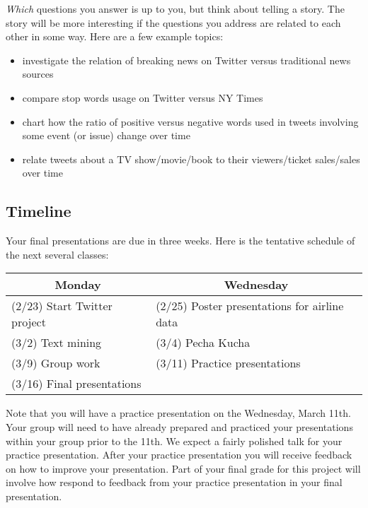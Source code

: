 \documentclass[11pt, oneside]{article}   	%
\begin{document}
{\em Which} questions you answer is up to you, but
think about telling a story. The story will be more interesting if the
questions you address are related to each other in some way.
Here are a few example topics:
\begin{itemize}
\item investigate the relation of breaking news on Twitter versus traditional
  news sources
\item compare stop words usage on Twitter versus NY Times
\item chart how the ratio of positive versus negative words used in tweets
  involving some event (or issue) change over time
\item relate tweets about a TV show/movie/book to their viewers/ticket sales/sales
  over time
\end{itemize}


\subsection*{Timeline}

Your final presentations are due in three weeks.  Here is the tentative schedule
of the next several classes:

\begin{table}[h]
\begin{tabular}{@{}l|l@{}}
\toprule
\multicolumn{1}{c|}{Monday} & \multicolumn{1}{c}{Wednesday}                 \\
\hline
(2/23) Start Twitter project & (2/25) Poster presentations for airline data \\
(3/2) Text mining            & (3/4) Pecha Kucha                            \\
(3/9) Group work             & (3/11) Practice presentations                \\
(3/16) Final presentations   &                                              \\                                       
\bottomrule
\end{tabular}
\end{table}

Note that you will have a practice presentation on the Wednesday, March 11th.
Your group will need to have already prepared and practiced your presentations
within your group prior to the 11th.  We expect a fairly polished talk for your
practice presentation.  After your practice presentation you will receive feedback
on how to improve your presentation.  Part of your final grade for this project
will involve how respond to feedback from your practice presentation in your
final presentation.
\end{document}
